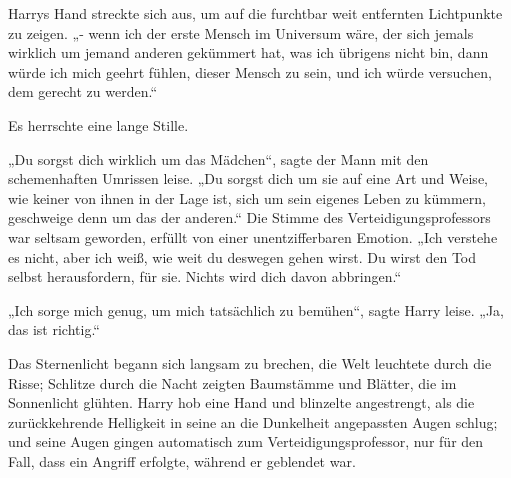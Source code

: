 Harrys Hand streckte sich aus, um auf die furchtbar weit entfernten Lichtpunkte zu zeigen. „- wenn ich der erste Mensch im Universum wäre, der sich jemals wirklich um jemand anderen gekümmert hat, was ich übrigens nicht bin, dann würde ich mich geehrt fühlen, dieser Mensch zu sein, und ich würde versuchen, dem gerecht zu werden.“

Es herrschte eine lange Stille.

„Du sorgst dich wirklich um das Mädchen“, sagte der Mann mit den schemenhaften Umrissen leise. „Du sorgst dich um sie auf eine Art und Weise, wie keiner von ihnen in der Lage ist, sich um sein eigenes Leben zu kümmern, geschweige denn um das der anderen.“ Die Stimme des Verteidigungsprofessors war seltsam geworden, erfüllt von einer unentzifferbaren Emotion. „Ich verstehe es nicht, aber ich weiß, wie weit du deswegen gehen wirst. Du wirst den Tod selbst herausfordern, für sie. Nichts wird dich davon abbringen.“

„Ich sorge mich genug, um mich tatsächlich zu bemühen“, sagte Harry leise. „Ja, das ist richtig.“

Das Sternenlicht begann sich langsam zu brechen, die Welt leuchtete durch die Risse; Schlitze durch die Nacht zeigten Baumstämme und Blätter, die im Sonnenlicht glühten. Harry hob eine Hand und blinzelte angestrengt, als die zurückkehrende Helligkeit in seine an die Dunkelheit angepassten Augen schlug; und seine Augen gingen automatisch zum Verteidigungsprofessor, nur für den Fall, dass ein Angriff erfolgte, während er geblendet war.

